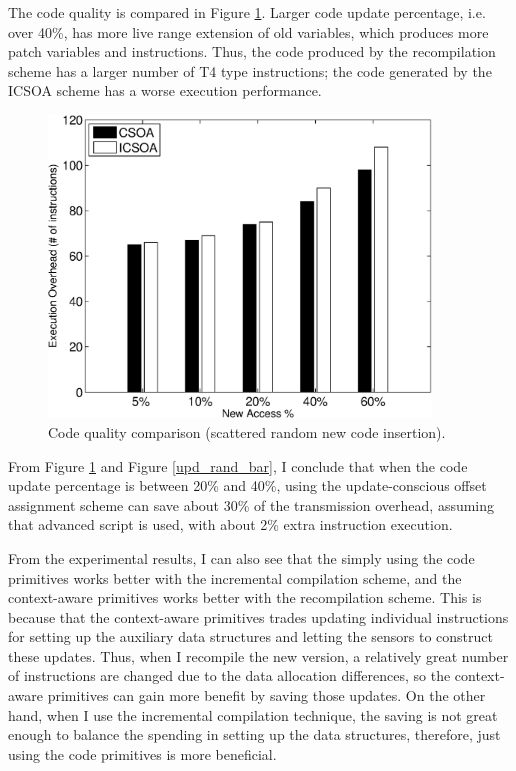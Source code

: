 The code quality is compared in Figure \ref{exe_rand_bar}. Larger code update percentage, i.e. over 40\%, has more live 
range extension of old variables, which produces more patch variables and instructions. Thus, the code produced by the 
recompilation scheme has a larger number of T4 type instructions; the code generated by the ICSOA scheme has a worse 
execution performance. 


\begin{figure}[htbp]
\begin{center}
\includegraphics[width=4in]{./figures/exe_rand_bar.eps}
\caption{Code quality comparison (scattered random new code insertion).}
\label{exe_rand_bar}
\end{center}
\vspace{-0.2in}
\end{figure}


From Figure \ref{exe_rand_bar} and Figure \ref{upd_rand_bar}, I conclude that when the code update percentage is 
between 20\% and 40\%, using the update-conscious offset assignment scheme can save about 30\% of the transmission 
overhead, assuming that advanced script is used, with about 2\% extra instruction execution.


From the experimental results, I can also see that the simply using the code primitives works better with the 
incremental compilation scheme, and the context-aware primitives works better with the recompilation scheme.
This is because that the context-aware primitives trades updating individual instructions for setting up the auxiliary 
data structures and letting the sensors to construct these updates.
Thus, when I recompile the new version, a relatively great number of instructions are changed due to the data 
allocation differences, so the  context-aware primitives can gain more benefit by saving those updates. 
On the other hand, when I use the incremental compilation technique, the saving is not great enough to balance the 
spending in setting up the data structures, therefore, just using the code primitives is more beneficial. 


